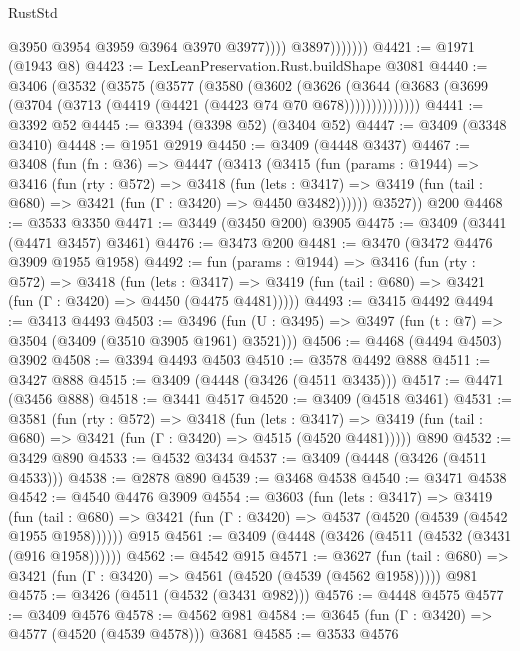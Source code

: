 \begin{lexlean}{RustStd}
\begin{coremodule}
                          @3950
                          @3954
                          @3959
                          @3964
                          @3970
                          @3977))))
                  @3897)))))))
@4421 := @1971 (@1943 @8)
@4423 := LexLeanPreservation.Rust.buildShape @3081
@4440 := @3406
    (@3532
      (@3575
        (@3577
          (@3580
            (@3602
              (@3626
                (@3644 (@3683 (@3699 (@3704 (@3713 (@4419 (@4421 (@4423 @74 @70 @678))))))))))))))
@4441 := @3392 @52
@4445 := @3394 (@3398 @52) (@3404 @52)
@4447 := @3409 (@3348 @3410)
@4448 := @1951 @2919
@4450 := @3409 (@4448 @3437)
@4467 := @3408
    (fun (fn : @36) =>
    @4447
      (@3413
        (@3415
          (fun (params : @1944) =>
          @3416
            (fun (rty : @572) =>
            @3418
              (fun (lets : @3417) =>
              @3419 (fun (tail : @680) => @3421 (fun (Γ : @3420) => @4450 @3482))))))
        @3527))
    @200
@4468 := @3533 @3350
@4471 := @3449 (@3450 @200) @3905
@4475 := @3409 (@3441 (@4471 @3457) @3461)
@4476 := @3473 @200
@4481 := @3470 (@3472 @4476 @3909 @1955 @1958)
@4492 := fun (params : @1944) =>
  @3416
    (fun (rty : @572) =>
    @3418
      (fun (lets : @3417) =>
      @3419 (fun (tail : @680) => @3421 (fun (Γ : @3420) => @4450 (@4475 @4481)))))
@4493 := @3415 @4492
@4494 := @3413 @4493
@4503 := @3496 (fun (U : @3495) => @3497 (fun (t : @7) => @3504 (@3409 (@3510 @3905 @1961) @3521)))
@4506 := @4468 (@4494 @4503) @3902
@4508 := @3394 @4493 @4503
@4510 := @3578 @4492 @888
@4511 := @3427 @888
@4515 := @3409 (@4448 (@3426 (@4511 @3435)))
@4517 := @4471 (@3456 @888)
@4518 := @3441 @4517
@4520 := @3409 (@4518 @3461)
@4531 := @3581
    (fun (rty : @572) =>
    @3418
      (fun (lets : @3417) =>
      @3419 (fun (tail : @680) => @3421 (fun (Γ : @3420) => @4515 (@4520 @4481)))))
    @890
@4532 := @3429 @890
@4533 := @4532 @3434
@4537 := @3409 (@4448 (@3426 (@4511 @4533)))
@4538 := @2878 @890
@4539 := @3468 @4538
@4540 := @3471 @4538
@4542 := @4540 @4476 @3909
@4554 := @3603
    (fun (lets : @3417) =>
    @3419
      (fun (tail : @680) => @3421 (fun (Γ : @3420) => @4537 (@4520 (@4539 (@4542 @1955 @1958))))))
    @915
@4561 := @3409 (@4448 (@3426 (@4511 (@4532 (@3431 (@916 @1958))))))
@4562 := @4542 @915
@4571 := @3627
    (fun (tail : @680) => @3421 (fun (Γ : @3420) => @4561 (@4520 (@4539 (@4562 @1958)))))
    @981
@4575 := @3426 (@4511 (@4532 (@3431 @982)))
@4576 := @4448 @4575
@4577 := @3409 @4576
@4578 := @4562 @981
@4584 := @3645 (fun (Γ : @3420) => @4577 (@4520 (@4539 @4578))) @3681
@4585 := @3533 @4576

\end{coremodule}
\end{lexlean}
